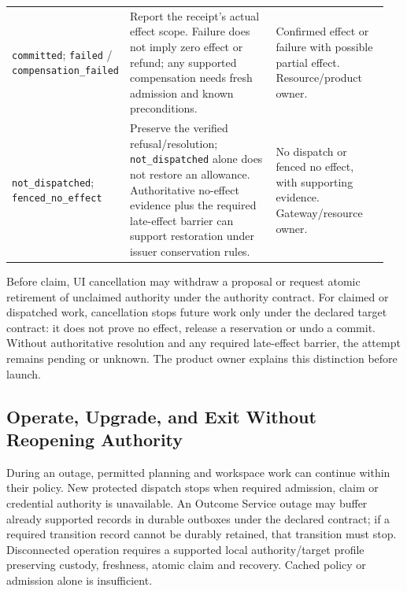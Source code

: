 {\begin{longtable}{@{}L{0.22\linewidth}L{0.42\linewidth}L{0.31\linewidth}@{}}
\addlinespace
\texttt{committed}; \texttt{failed} / \texttt{compensation\_failed} & Report the receipt's actual effect scope. Failure does not imply zero effect or refund; any supported compensation needs fresh admission and known preconditions. & Confirmed effect or failure with possible partial effect. Resource/product owner.\\
\addlinespace
\texttt{not\_dispatched}; \texttt{fenced\_no\_effect} & Preserve the verified refusal/resolution; \texttt{not\_dispatched} alone does not restore an allowance. Authoritative no-effect evidence plus the required late-effect barrier can support restoration under issuer conservation rules. & No dispatch or fenced no effect, with supporting evidence. Gateway/resource owner.\\
\end{longtable}
}

Before claim, UI cancellation may withdraw a proposal or request atomic
retirement of unclaimed authority under the authority contract. For claimed
or dispatched work, cancellation stops future work only under the declared
target contract: it does not prove no effect, release a reservation or undo a
commit. Without authoritative resolution and any required late-effect barrier,
the attempt remains pending or unknown. The product owner explains this
distinction before launch.

\subsection{Operate, Upgrade, and Exit Without Reopening Authority}
\label{sec:adoption-operations}

During an outage, permitted planning and workspace work can continue within
their policy. New protected dispatch stops when required admission, claim or
credential authority is unavailable. An Outcome Service outage may buffer
already supported records in durable outboxes under the declared contract;
if a required transition record cannot be durably retained, that transition
must stop. Disconnected operation requires a supported local authority/target
profile preserving custody, freshness, atomic claim and recovery. Cached policy
or admission alone is insufficient.

